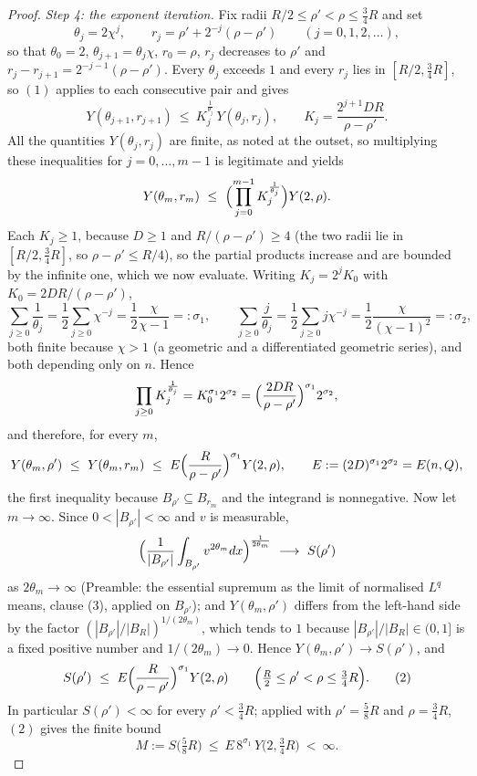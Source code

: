 \begin{proof}
\emph{Step 4: the exponent iteration.}  Fix radii $R/2\le\rho'<\rho\le\frac34R$
and set
\[
\theta_j=2\chi^j,\qquad r_j=\rho'+2^{-j}(\rho-\rho')\qquad(j=0,1,2,\dots),
\]
so that $\theta_0=2$, $\theta_{j+1}=\theta_j\chi$, $r_0=\rho$, $r_j$ decreases to
$\rho'$ and $r_j-r_{j+1}=2^{-j-1}(\rho-\rho')$.  Every $\theta_j$ exceeds $1$ and
every $r_j$ lies in $[R/2,\frac34R]$, so $(1)$ applies to each consecutive pair
and gives
\[
Y(\theta_{j+1},r_{j+1})\ \le\ K_j^{\frac1{\theta_j}}\,Y(\theta_j,r_j),
\qquad
K_j=\frac{2^{j+1}DR}{\rho-\rho'} .
\]
All the quantities $Y(\theta_j,r_j)$ are finite, as noted at the outset, so
multiplying these inequalities for $j=0,\dots,m-1$ is legitimate and yields
\[
Y(\theta_m,r_m)\ \le\ \Bigl(\prod_{j=0}^{m-1}K_j^{\frac1{\theta_j}}\Bigr)
Y(2,\rho).
\]
Each $K_j\ge1$, because $D\ge1$ and $R/(\rho-\rho')\ge4$ (the two radii lie in
$[R/2,\frac34R]$, so $\rho-\rho'\le R/4$), so the partial products increase and
are bounded by the infinite one, which we now evaluate.  Writing
$K_j=2^jK_0$ with $K_0=2DR/(\rho-\rho')$,
\[
\sum_{j\ge0}\frac1{\theta_j}=\frac12\sum_{j\ge0}\chi^{-j}=\frac12\frac\chi{\chi-1}=:\sigma_1,
\qquad
\sum_{j\ge0}\frac j{\theta_j}=\frac12\sum_{j\ge0}j\chi^{-j}
=\frac12\frac\chi{(\chi-1)^2}=:\sigma_2 ,
\]
both finite because $\chi>1$ (a geometric and a differentiated geometric series),
and both depending only on $n$.  Hence
\[
\prod_{j\ge0}K_j^{\frac1{\theta_j}}
=K_0^{\sigma_1}2^{\sigma_2}
=\Bigl(\frac{2DR}{\rho-\rho'}\Bigr)^{\sigma_1}2^{\sigma_2},
\]
and therefore, for every $m$,
\[
Y(\theta_m,\rho')\ \le\ Y(\theta_m,r_m)
\ \le\ E\Bigl(\frac R{\rho-\rho'}\Bigr)^{\sigma_1}Y(2,\rho),
\qquad E:=(2D)^{\sigma_1}2^{\sigma_2}=E(n,Q),
\]
the first inequality because $B_{\rho'}\subseteq B_{r_m}$ and the integrand is
nonnegative.  Now let $m\to\infty$.  Since
$0<|B_{\rho'}|<\infty$ and $v$ is measurable,
\[
\Bigl(\frac1{|B_{\rho'}|}\int_{B_{\rho'}}v^{2\theta_m}dx\Bigr)^{\frac1{2\theta_m}}
\ \longrightarrow\ S(\rho')
\]
as $2\theta_m\to\infty$ (Preamble: the essential supremum as the limit of
normalised $L^q$ means, clause (3), applied on $B_{\rho'}$); and
$Y(\theta_m,\rho')$ differs from the left-hand side by the factor
$(|B_{\rho'}|/|B_R|)^{1/(2\theta_m)}$, which tends to $1$ because
$|B_{\rho'}|/|B_R|\in(0,1]$ is a fixed positive number and
$1/(2\theta_m)\to0$.  Hence $Y(\theta_m,\rho')\to S(\rho')$, and
\[
S(\rho')\ \le\ E\Bigl(\frac R{\rho-\rho'}\Bigr)^{\sigma_1}Y(2,\rho)
\qquad\Bigl(\tfrac R2\le\rho'<\rho\le\tfrac34R\Bigr).
\tag{2}
\]
In particular $S(\rho')<\infty$ for every $\rho'<\frac34R$; applied with
$\rho'=\frac58R$ and $\rho=\frac34R$, $(2)$ gives the finite bound
\[
M:=S\bigl(\tfrac58R\bigr)\ \le\ E\,8^{\sigma_1}\,Y\bigl(2,\tfrac34R\bigr)\ <\ \infty .
\tag{3}
\]


\end{proof}
